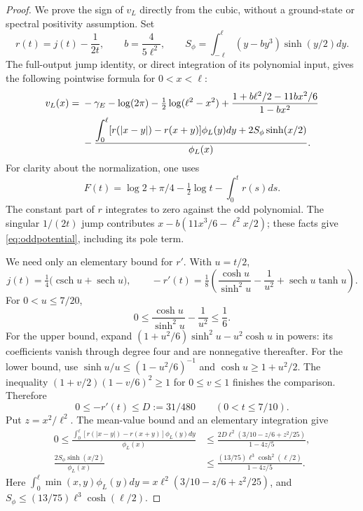 \documentclass[11pt]{article}
\numberwithin{equation}{section}
\theoremstyle{definition}
\theoremstyle{remark}
\begin{document}
\begin{proof}
We prove the sign of $v_L$ directly from the cubic, without a ground-state
or spectral positivity assumption. Set
\[
r(t)=j(t)-\frac1{2t},\qquad b=\frac4{5\ell^2},\qquad
S_\phi=\int_{-\ell}^{\ell}(y-by^3)\sinh(y/2)dy.
\]
The full-output jump identity, or direct integration of its polynomial
input, gives the following pointwise formula for $0<x<\ell$:
\begin{align}
v_L(x)={}&-\gamma_E-\log(2\pi)-\tfrac12\log(\ell^2-x^2)
 +\frac{1+b\ell^2/2-11bx^2/6}{1-bx^2}\notag\\
&-\frac{\displaystyle\int_0^\ell
 [r(|x-y|)-r(x+y)]\phi_L(y)dy
       +2S_\phi\sinh(x/2)}{\phi_L(x)}.
\label{eq:oddpotential}
\end{align}
For clarity about the normalization, one uses
\[
F(t)=\log2+\pi/4-\tfrac12\log t-\int_0^t r(s)ds.
\]
The constant part of $r$ integrates to zero against the odd polynomial.
The singular $1/(2t)$ jump contributes
$x-b(11x^3/6-\ell^2x/2)$; these facts give
\eqref{eq:oddpotential}, including its pole term.

We need only an elementary bound for $r'$. With $u=t/2$,
\begin{equation}
j(t)=\tfrac14\bigl(\operatorname{csch}u+\operatorname{sech}u\bigr),
\qquad
-r'(t)=\tfrac18\left(\frac{\cosh u}{\sinh^2u}-\frac1{u^2}
                   +\operatorname{sech}u\tanh u\right).
\end{equation}
For $0<u\leq7/20$,
\begin{equation}
0\leq\frac{\cosh u}{\sinh^2u}-\frac1{u^2}\leq\frac16.
\label{eq:cschbound}
\end{equation}
For the upper bound, expand
$(1+u^2/6)\sinh^2u-u^2\cosh u$ in powers: its coefficients vanish
through degree four and are nonnegative thereafter. For the lower bound,
use $\sinh u/u\leq(1-u^2/6)^{-1}$ and $\cosh u\geq1+u^2/2$.
The inequality $(1+v/2)(1-v/6)^2\geq1$ for $0\leq v\leq1$ finishes
the comparison. Therefore
\begin{equation}
0\leq-r'(t)\leq D:=31/480\qquad(0<t\leq7/10).
\end{equation}
Put $z=x^2/\ell^2$. The mean-value bound and an elementary integration give
\begin{align}
0\leq\frac{\int_0^\ell[r(|x-y|)-r(x+y)]\phi_L(y)dy}{\phi_L(x)}
&\leq\frac{2D\ell^2(3/10-z/6+z^2/25)}{1-4z/5},\\
\frac{2S_\phi\sinh(x/2)}{\phi_L(x)}
&\leq\frac{(13/75)\ell^3\cosh^2(\ell/2)}{1-4z/5}.
\end{align}
Here $\int_0^\ell\min(x,y)\phi_L(y)dy
=x\ell^2(3/10-z/6+z^2/25)$, and
$S_\phi\leq(13/75)\ell^3\cosh(\ell/2)$.


\end{proof}
\end{document}
